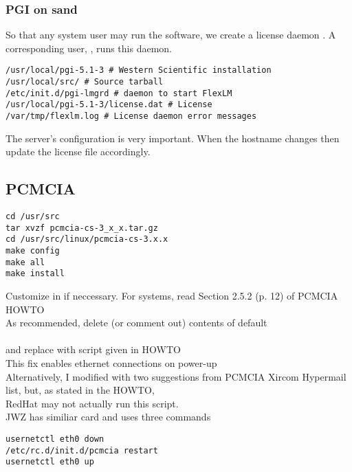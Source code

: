 \documentclass[12pt,twoside]{article}
\begin{document}
\subsubsection{PGI on sand}\label{sxn:pgi_sand}
So that any system user may run the software, we create a
 license daemon .
A corresponding user, , runs this daemon. 
\begin{verbatim}
/usr/local/pgi-5.1-3 # Western Scientific installation
/usr/local/src/ # Source tarball
/etc/init.d/pgi-lmgrd # daemon to start FlexLM
/usr/local/pgi-5.1-3/license.dat # License
/var/tmp/flexlm.log # License daemon error messages 
\end{verbatim}
The server's  configuration is very important.
When the hostname changes then update the license file accordingly. 

\subsection{PCMCIA}\label{sxn:pcmcia}
\begin{verbatim}
cd /usr/src
tar xvzf pcmcia-cs-3_x_x.tar.gz 
cd /usr/src/linux/pcmcia-cs-3.x.x
make config
make all 
make install
\end{verbatim}
Customize in  if neccessary.
For  systems, read Section 2.5.2 (p. 12) of PCMCIA HOWTO\\
As recommended, delete (or comment out) contents of default\\
\\
and replace with script given in HOWTO\\
This fix enables ethernet connections on power-up\\
Alternatively, I modified  with two
suggestions from PCMCIA Xircom Hypermail list, but, as stated in the
HOWTO,\\ 
RedHat may not actually run this script.\\
JWZ has similiar card and uses three commands \\
\begin{verbatim}
usernetctl eth0 down
/etc/rc.d/init.d/pcmcia restart
usernetctl eth0 up
\end{verbatim}
\end{document}
